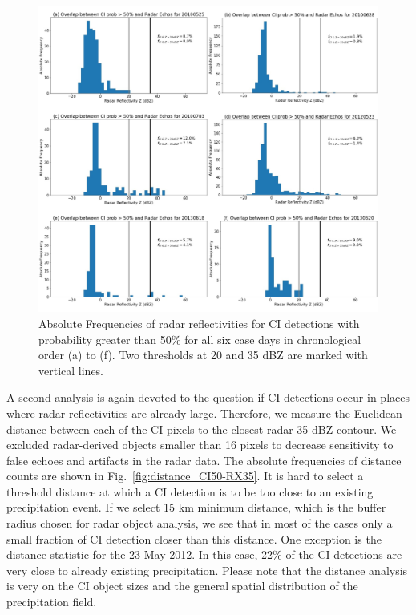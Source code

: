 \begin{figure}
\centering
\includegraphics[width=\textwidth]{Grafiken/Abbildungen/overlap_CI50_RX.jpg}
\caption{Absolute Frequencies of radar reflectivities for CI detections with probability greater than 50\% for all six case days in chronological order (a) to (f). Two thresholds at 20 and 35 dBZ are marked with vertical lines.}
\label{fig:overlap_CI50-RX}
\end{figure}

A second analysis is again devoted to the question if CI detections occur in places where radar reflectivities are already large. Therefore, we measure the Euclidean distance between each of the CI pixels to the closest radar 35 dBZ contour. We excluded radar-derived objects smaller than 16 pixels to decrease sensitivity to false echoes and artifacts in the radar data. The absolute frequencies of distance counts are shown in Fig.~\ref{fig:distance_CI50-RX35}. It is hard to select a threshold distance at which a CI detection is  to be too close to an existing precipitation event. If we select 15 km minimum distance, which is the buffer radius chosen for  radar object analysis, we see that in most of the cases only a small fraction of CI detection  closer than this distance. One exception is the distance statistic for the 23 May 2012. In this case, 22\% of the CI detections are very close to already existing precipitation. Please note that the distance analysis is very  on the CI object sizes and the general spatial distribution of the precipitation field.


